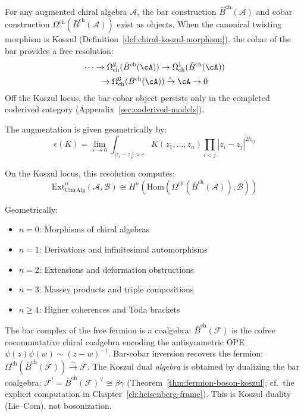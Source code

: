 \begin{theorem}
\label{thm:cobar-resolution-scoped}
For any augmented chiral algebra $\mathcal{A}$, the bar construction
$\bar{B}^{\mathrm{ch}}(\mathcal{A})$ and cobar construction
$\Omega^{\mathrm{ch}}(\bar{B}^{\mathrm{ch}}(\mathcal{A}))$ exist as objects.
When the canonical twisting morphism is Koszul
\textup{(}Definition~\textup{\ref{def:chiral-koszul-morphism})},
the cobar of the bar provides a free resolution:
\begin{multline*}
\cdots \to \Omega^2_{\mathrm{ch}}(\bar{B}^{\mathrm{ch}}(\cA))
\to \Omega^1_{\mathrm{ch}}(\bar{B}^{\mathrm{ch}}(\cA))\\
\to \Omega^0_{\mathrm{ch}}(\bar{B}^{\mathrm{ch}}(\cA))
\xrightarrow{\epsilon} \cA \to 0
\end{multline*}
Off the Koszul locus, the bar-cobar object persists only in the
completed coderived category
\textup{(}Appendix~\textup{\ref{sec:coderived-models})}.

The augmentation is given geometrically by:
\[\epsilon(K) = \lim_{\varepsilon \to 0} \int_{|z_i - z_j| > \varepsilon} K(z_1, \ldots, z_n) \prod_{i<j} |z_i - z_j|^{2h_{ij}}\]
\end{theorem}

\begin{remark}
On the Koszul locus, this resolution computes:
\[\text{Ext}^n_{\text{ChirAlg}}(\mathcal{A}, \mathcal{B}) \cong H^n(\text{Hom}(\Omega^{\text{ch}}(\bar{B}^{\text{ch}}(\mathcal{A})), \mathcal{B}))\]

Geometrically:
\begin{itemize}
\item $n = 0$: Morphisms of chiral algebras
\item $n = 1$: Derivations and infinitesimal automorphisms
\item $n = 2$: Extensions and deformation obstructions
\item $n = 3$: Massey products and triple compositions
\item $n \geq 4$: Higher coherences and Toda brackets
\end{itemize}
\end{remark}

\begin{example}
The bar complex of the free fermion is a coalgebra:
$\bar{B}^{\mathrm{ch}}(\mathcal{F})$ is the cofree cocommutative
chiral coalgebra encoding the antisymmetric OPE
$\psi(z)\psi(w) \sim (z{-}w)^{-1}$.  Bar-cobar inversion recovers
the fermion:
$\Omega^{\mathrm{ch}}(\bar{B}^{\mathrm{ch}}(\mathcal{F}))
\xrightarrow{\sim} \mathcal{F}$.
The Koszul dual \emph{algebra} is obtained by dualizing the bar
coalgebra:
$\mathcal{F}^! = \bar{B}^{\mathrm{ch}}(\mathcal{F})^\vee
\cong \beta\gamma$
(Theorem~\ref{thm:fermion-boson-koszul};
cf.\ the explicit computation in Chapter~\ref{ch:heisenberg-frame}).
This is Koszul duality (Lie--Com), not bosonization.
\end{example}


